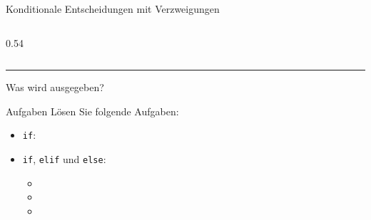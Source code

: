 \begin{frame}[fragile]{Konditionale Entscheidungen mit Verzweigungen}
    \begin{columns}
        \begin{column}{0.54\textwidth}
            
        \end{column}
    \end{columns}


    \vspace{0.5cm}
    \rule{\textwidth}{.5pt}
    \begin{center}
        Was wird ausgegeben?
    \end{center}
\end{frame}



\begin{frame}{Aufgaben}
    Lösen Sie folgende Aufgaben:
    \begin{itemize}
        \item \lstinline|if|: 
        \item \lstinline|if|, \lstinline|elif| und \lstinline|else|:
              \begin{itemize}
                  \item {}
                  \item {}
                  \item {}
              \end{itemize}
    \end{itemize}
\end{frame}

